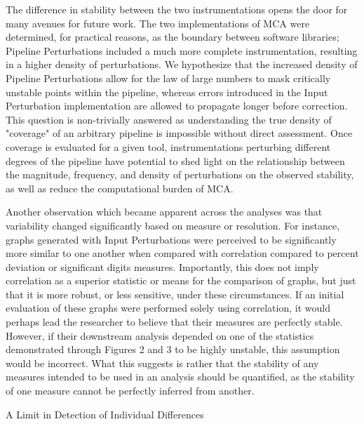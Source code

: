 \documentclass[fleqn,10pt]{SelfArx} %
\begin{document}
The difference in stability between the two instrumentations opens the door for many avenues for future work. The two implementations of MCA were determined, for practical reasons, as the boundary between software libraries; Pipeline Perturbations included a much more complete instrumentation, resulting in a higher density of perturbations. We hypothesize that the increased density of Pipeline Perturbations allow for the law of large numbers to mask critically unstable points within the pipeline, whereas errors introduced in the Input Perturbation implementation are allowed to propagate longer before correction. This question is non-trivially answered as understanding the true density of "coverage" of an arbitrary pipeline is impossible without direct assessment. Once coverage is evaluated for a given tool, instrumentations perturbing different degrees of the pipeline have potential to shed light on the relationship between the magnitude, frequency, and density of perturbations on the observed stability, as well as reduce the computational burden of MCA.

Another observation which became apparent across the analyses was that variability changed significantly based on measure or resolution. For instance, graphs generated with Input Perturbations were perceived to be significantly more similar to one another when compared with correlation compared to percent deviation or significant digits measures. Importantly, this does not imply correlation as a superior statistic or means for the comparison of graphs, but just that it is more robust, or less sensitive, under these circumstances. If an initial evaluation of these graphs were performed solely using correlation, it would perhaps lead the researcher to believe that their measures are perfectly stable. However, if their downstream analysis depended on one of the statistics demonstrated through Figures 2 and 3 to be highly unstable, this assumption would be incorrect. What this suggests is rather that the stability of any measures intended to be used in an analysis should be quantified, as the stability of one measure cannot be perfectly inferred from another.

A Limit in Detection of Individual Differences
\end{document}
